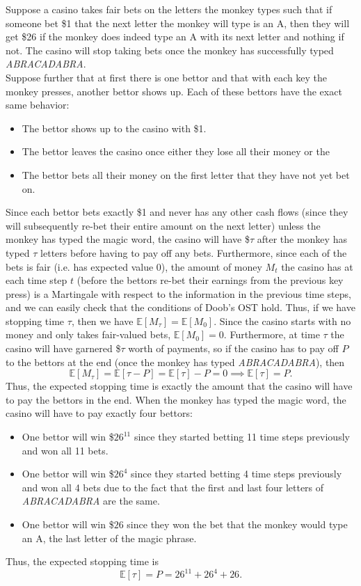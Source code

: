 \begin{solution}
	Suppose a casino takes fair bets on the letters the monkey types such that if someone bet \$1 that the next letter the monkey will type is an A, then they will get \$26 if the monkey does indeed type an A with its next letter and nothing if not. The casino will stop taking bets once the monkey has successfully typed \textit{ABRACADABRA}. \\[0.1in]
	Suppose further that at first there is one bettor and that with each key the monkey presses, another bettor shows up. Each of these bettors have the exact same behavior: \begin{itemize}
		\item The bettor shows up to the casino with \$1.
		\item The bettor leaves the casino once either they lose all their money or the 
		\item The bettor bets all their money on the first letter that they have not yet bet on.
	\end{itemize}
	Since each bettor bets exactly \$1 and never has any other cash flows (since they will subsequently re-bet their entire amount on the next letter) unless the monkey has typed the magic word, the casino will have \$$\tau$ after the monkey has typed $\tau$ letters before having to pay off any bets. Furthermore, since each of the bets is fair (i.e. has expected value 0), the amount of money $M_t$ the casino has at each time step $t$ (before the bettors re-bet their earnings from the previous key press) is a Martingale with respect to the information in the previous time steps, and we can easily check that the conditions of Doob's OST hold. Thus, if we have stopping time $\tau$, then we have $\mathbb E[M_\tau]=\mathbb E[M_0]$. Since the casino starts with no money and only takes fair-valued bets, $\mathbb E[M_0]=0$. Furthermore, at time $\tau$ the casino will have garnered \$$\tau$ worth of payments, so if the casino has to pay off $P$ to the bettors at the end (once the monkey has typed \textit{ABRACADABRA}), then $$ \mathbb E[M_\tau] = \mathbb E[\tau-P] = \mathbb E[\tau]-P = 0 \implies \mathbb E[\tau] = P. $$ Thus, the expected stopping time is exactly the amount that the casino will have to pay the bettors in the end. When the monkey has typed the magic word, the casino will have to pay exactly four bettors: \begin{itemize}
		\item One bettor will win \$$26^{11}$ since they started betting 11 time steps previously and won all 11 bets.
		\item One bettor will win \$$26^4$ since they started betting 4 time steps previously and won all 4 bets due to the fact that the first and last four letters of \textit{ABRACADABRA} are the same.
		\item One bettor will win \$$26$ since they won the bet that the monkey would type an A, the last letter of the magic phrase.
	\end{itemize}
	Thus, the expected stopping time is $$ \mathbb E[\tau] = P = 26^{11} + 26^4 + 26. $$ 
\end{solution}

